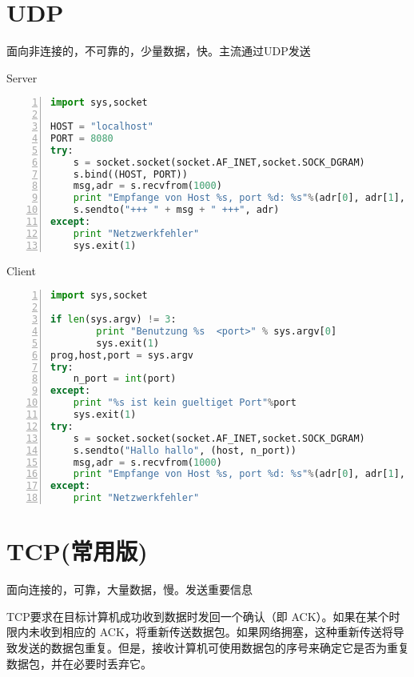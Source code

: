 \documentclass[fleqn]{article}
\begin{document}
\clearpage
\section{UDP}
\noindent 面向非连接的，不可靠的，少量数据，快。主流通过UDP发送

\begin{center}
    Server
\end{center}
\begin{lstlisting}[language = Python, numbers=left, 
    numberstyle=\tiny,keywordstyle=\color{blue!70},
    commentstyle=\color{red!50!green!50!blue!50},frame=shadowbox,
    rulesepcolor=\color{red!20!green!20!blue!20},basicstyle=\ttfamily]
import sys,socket

HOST = "localhost"
PORT = 8080
try:
    s = socket.socket(socket.AF_INET,socket.SOCK_DGRAM)
    s.bind((HOST, PORT))
    msg,adr = s.recvfrom(1000)
    print "Empfange von Host %s, port %d: %s"%(adr[0], adr[1], msg)
    s.sendto("+++ " + msg + " +++", adr)
except:
    print "Netzwerkfehler"
    sys.exit(1)
\end{lstlisting}

\begin{center}
    Client
\end{center}
\begin{lstlisting}[language = Python, numbers=left, 
    numberstyle=\tiny,keywordstyle=\color{blue!70},
    commentstyle=\color{red!50!green!50!blue!50},frame=shadowbox,
    rulesepcolor=\color{red!20!green!20!blue!20},basicstyle=\ttfamily]
import sys,socket

if len(sys.argv) != 3:
        print "Benutzung %s  <port>" % sys.argv[0]
        sys.exit(1)
prog,host,port = sys.argv
try:
    n_port = int(port)
except:
    print "%s ist kein gueltiget Port"%port
    sys.exit(1)
try:
    s = socket.socket(socket.AF_INET,socket.SOCK_DGRAM)
    s.sendto("Hallo hallo", (host, n_port))
    msg,adr = s.recvfrom(1000)
    print "Empfange von Host %s, port %d: %s"%(adr[0], adr[1], msg)
except:
    print "Netzwerkfehler"
\end{lstlisting}


\clearpage
\section{TCP(常用版)}
\noindent 面向连接的，可靠，大量数据，慢。发送重要信息

TCP要求在目标计算机成功收到数据时发回一个确认（即 ACK）。如果在某个时限内未收到相应的 ACK，将重新传送数据包。如果网络拥塞，这种重新传送将导致发送的数据包重复。但是，接收计算机可使用数据包的序号来确定它是否为重复数据包，并在必要时丢弃它。
\end{document}
